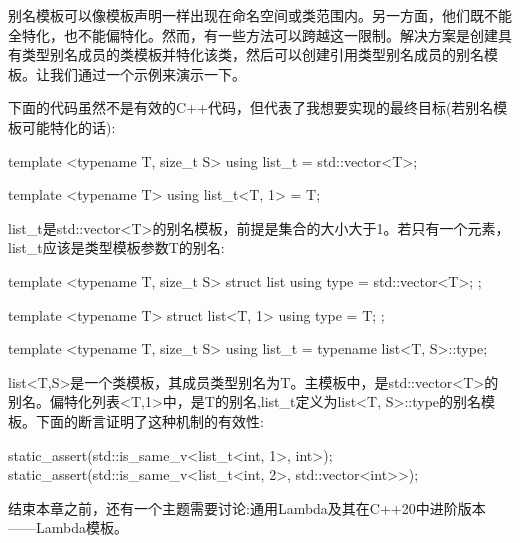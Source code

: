 别名模板可以像模板声明一样出现在命名空间或类范围内。另一方面，他们既不能全特化，也不能偏特化。然而，有一些方法可以跨越这一限制。解决方案是创建具有类型别名成员的类模板并特化该类，然后可以创建引用类型别名成员的别名模板。让我们通过一个示例来演示一下。

下面的代码虽然不是有效的C++代码，但代表了我想要实现的最终目标(若别名模板可能特化的话):

\begin{cpp}
template <typename T, size_t S>
using list_t = std::vector<T>;

template <typename T>
using list_t<T, 1> = T;
\end{cpp}

list\_t是std::vector<T>的别名模板，前提是集合的大小大于1。若只有一个元素，list\_t应该是类型模板参数T的别名:

\begin{cpp}
template <typename T, size_t S>
struct list
{
	using type = std::vector<T>;
};

template <typename T>
struct list<T, 1>
{
	using type = T;
};

template <typename T, size_t S>
using list_t = typename list<T, S>::type;
\end{cpp}

list<T,S>是一个类模板，其成员类型别名为T。主模板中，是std::vector<T>的别名。偏特化列表<T,1>中，是T的别名,list\_t定义为list<T, S>::type的别名模板。下面的断言证明了这种机制的有效性:

\begin{cpp}
static_assert(std::is_same_v<list_t<int, 1>, int>);
static_assert(std::is_same_v<list_t<int, 2>,
std::vector<int>>);
\end{cpp}

结束本章之前，还有一个主题需要讨论:通用Lambda及其在C++20中进阶版本——Lambda模板。




















